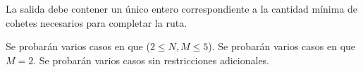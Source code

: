\documentclass{oci}
\begin{document}
\begin{outputDescription}
  La salida debe contener un único entero correspondiente a la cantidad mínima
  de cohetes necesarios para completar la ruta.
\end{outputDescription}

\begin{scoreDescription}
  Se probarán varios casos en que ($2 \leq N, M \leq 5$).
  Se probarán varios casos en que $M=2$.
  Se probarán varios casos sin restricciones adicionales.
\end{scoreDescription}

\begin{sampleDescription}
\end{sampleDescription}
\end{document}
